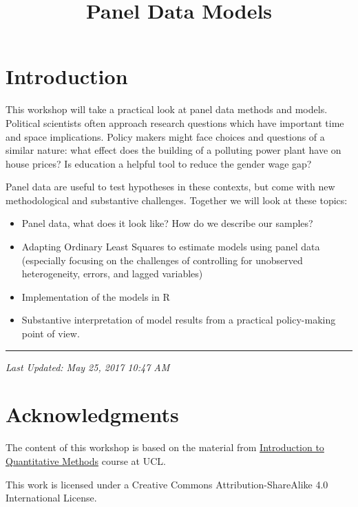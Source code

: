 \documentclass[]{article}
\title{Panel Data Models}
\author{}
\date{}
\providecommand{\tightlist}{%
  \setlength{\itemsep}{0pt}\setlength{\parskip}{0pt}}
\theoremstyle{definition}
\theoremstyle{definition}
\theoremstyle{remark}
\begin{document}
\maketitle

{
\setcounter{tocdepth}{2}
\tableofcontents
}
\section{Introduction}\label{introduction}

This workshop will take a practical look at panel data methods and
models. Political scientists often approach research questions which
have important time and space implications. Policy makers might face
choices and questions of a similar nature: what effect does the building
of a polluting power plant have on house prices? Is education a helpful
tool to reduce the gender wage gap?

Panel data are useful to test hypotheses in these contexts, but come
with new methodological and substantive challenges. Together we will
look at these topics:

\begin{itemize}
\tightlist
\item
  Panel data, what does it look like? How do we describe our samples?
\item
  Adapting Ordinary Least Squares to estimate models using panel data
  (especially focusing on the challenges of controlling for unobserved
  heterogeneity, errors, and lagged variables)
\item
  Implementation of the models in R
\item
  Substantive interpretation of model results from a practical
  policy-making point of view.
\end{itemize}

\begin{center}\rule{0.5\linewidth}{\linethickness}\end{center}

\emph{Last Updated: May 25, 2017 10:47 AM}

\section{Acknowledgments}\label{acknowledgments}

The content of this workshop is based on the material from
\href{https://uclspp.github.io/PUBLG100}{Introduction to Quantitative
Methods} course at UCL.

This work is licensed under a Creative Commons Attribution-ShareAlike
4.0 International License.
\end{document}
